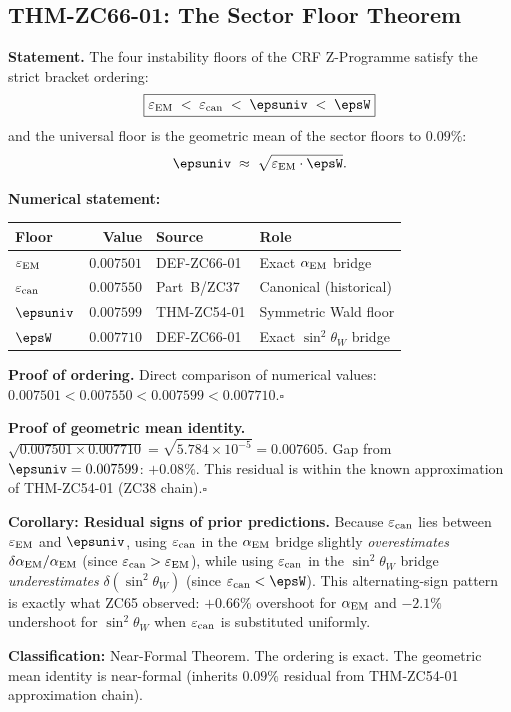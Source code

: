 \documentclass[12pt, a4paper]{article}
\renewcommand{\epsEM}{\varepsilon_{\rm EM}}
\renewcommand{\epscan}{\varepsilon_{\rm can}}
\renewcommand{\swsq}{\sin^2\!\theta_W}
\renewcommand{\aEM}{\alpha_{\rm EM}}
\begin{document}
\subsection{THM-ZC66-01: The Sector Floor Theorem}
\label{sec:thm}


\begin{formalbox}[title={THM-ZC66-01: Sector Floor Theorem ($R_0/R_{\max}$,
  Near-Formal)}]
\textbf{Statement.}
The four instability floors of the CRF Z-Programme satisfy
the strict bracket ordering:
\begin{equation}
  \boxed{
  \epsEM
  \;<\;
  \epscan
  \;<\;
  \epsuniv
  \;<\;
  \epsW
  }
  \label{eq:ordering}
\end{equation}
and the universal floor is the geometric mean of the sector
floors to $0.09\%$:
\begin{equation}
  \epsuniv \;\approx\; \sqrt{\epsEM \cdot \epsW}.
  \label{eq:thmgeom}
\end{equation}

\textbf{Numerical statement:}
\begin{center}
\renewcommand{\arraystretch}{1.25}
\begin{tabular}{@{}lrll@{}}
\toprule
Floor & Value & Source & Role \\
\midrule
$\epsEM$    & $0.007501$ & DEF-ZC66-01       & Exact $\aEM$ bridge \\
$\epscan$   & $0.007550$ & Part~B/ZC37       & Canonical (historical) \\
$\epsuniv$  & $0.007599$ & THM-ZC54-01       & Symmetric Wald floor \\
$\epsW$     & $0.007710$ & DEF-ZC66-01       & Exact $\swsq$ bridge \\
\bottomrule
\end{tabular}
\end{center}

\textbf{Proof of ordering.}
Direct comparison of numerical values:
$0.007501 < 0.007550 < 0.007599 < 0.007710$.\hfill$\square$

\textbf{Proof of geometric mean identity.}
$\sqrt{0.007501 \times 0.007710} = \sqrt{5.784\times10^{-5}} = 0.007605$.
Gap from $\epsuniv = 0.007599$: $+0.08\%$.
This residual is within the known approximation of
THM-ZC54-01 (ZC38 chain).\hfill$\square$

\textbf{Corollary: Residual signs of prior predictions.}
Because $\epscan$ lies between $\epsEM$ and $\epsuniv$,
using $\epscan$ in the $\aEM$ bridge slightly \emph{overestimates}
$\delta\aEM/\aEM$ (since $\epscan > \epsEM$),
while using $\epscan$ in the $\swsq$ bridge
\emph{underestimates} $\delta(\swsq)$ (since $\epscan < \epsW$).
This alternating-sign pattern is exactly what ZC65 observed:
$+0.66\%$ overshoot for $\aEM$ and $-2.1\%$ undershoot
for $\swsq$ when $\epscan$ is substituted uniformly.

\textbf{Classification:} Near-Formal Theorem.
The ordering is exact.
The geometric mean identity is near-formal (inherits
$0.09\%$ residual from THM-ZC54-01 approximation chain).
\end{formalbox}
\end{document}
